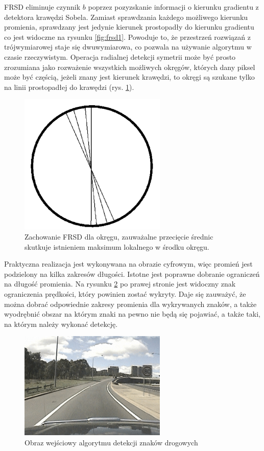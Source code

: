 FRSD eliminuje czynnik $b$ poprzez pozyzskanie informacji o kierunku gradientu z detektora krawędzi Sobela. Zamiast sprawdzania każdego możliwego kierunku promienia, sprawdzany jest jedynie kierunek prostopadły do kierunku gradientu co jest widoczne na rysunku \ref{fig:frsd1}. Powoduje to, że przestrzeń rozwiązań z trójwymiarowej staje się dwuwymiarowa, co pozwala na używanie algorytmu w czasie rzeczywistym. Operacja radialnej detekcji symetrii może być prosto zrozumiana jako rozważenie wszystkich możliwych okręgów, których dany piksel może być częścią, jeżeli znany jest kierunek krawędzi, to okręgi są szukane tylko na linii prostopadłej do krawędzi (rys. \ref{fig:frsd2}).

\begin{figure}
  \centering
  \includegraphics[width=7cm]{img/fsrd2.png}
  \caption{Zachowanie FRSD dla okręgu, zauważalne przecięcie średnic skutkuje istnieniem maksimum lokalnego w środku okręgu.\cite{T2}}
  \label{fig:frsd2}
\end{figure}

Praktyczna realizacja jest wykonywana na obrazie cyfrowym, więc promień jest podzielony na kilka zakresów długości. Istotne jest poprawne dobranie ograniczeń na długość promienia. Na rysunku \ref{fig:tsd} po prawej stronie jest widoczny znak ograniczenia prędkości, który powinien zostać wykryty. Daje się zauważyć, że można dobrać odpowiednie zakresy promienia dla wykrywanych znaków, a także wyodrębnić obszar na którym znaki na pewno nie będą się pojawiać, a także taki, na którym należy wykonać detekcję.
\begin{figure}
  \centering
  \includegraphics[width=7cm]{img/znaki1.png}
  \caption{Obraz wejściowy algorytmu detekcji znaków drogowych\cite{T2}}
  \label{fig:tsd}
\end{figure}

